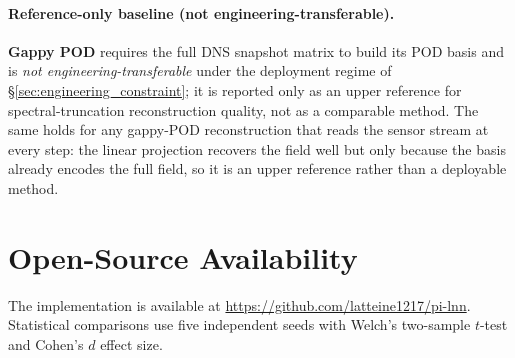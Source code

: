 \paragraph{Reference-only baseline (not engineering-transferable).}
\textbf{Gappy POD} requires the full DNS snapshot matrix to build its POD basis and is \emph{not engineering-transferable} under the deployment regime of \S\ref{sec:engineering_constraint}; it is reported only as an upper reference for spectral-truncation reconstruction quality, not as a comparable method. The same holds for any gappy-POD reconstruction that reads the sensor stream at every step: the linear projection recovers the field well but only because the basis already encodes the full field, so it is an upper reference rather than a deployable method.

\section{Open-Source Availability}
\label{sec:impl_env}

The implementation is available at \url{https://github.com/latteine1217/pi-lnn}. Statistical comparisons use five independent seeds with Welch's two-sample $t$-test and Cohen's $d$ effect size.

